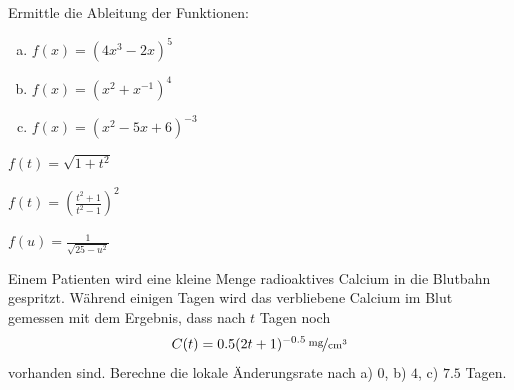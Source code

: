 \documentclass[%
11pt,%
twoside,%
titlepage,%
german,%
headsepline%
]{scrartcl}
\begin{document}
\begin{ueb}\label{uebkettenregel}
Ermittle die Ableitung der Funktionen:

\begin{minipage}{0.45\textwidth}
\begin{enumerate}[a)]
    \item $f(x)=(4x^3-2x)^5$
    \item $f(x)=(x^2+x^{-1})^4$
    \item $f(x)=(x^2-5x+6)^{-3}$
\end{enumerate}
\end{minipage}
\begin{minipage}{0.45\textwidth}
\begin{enumeratea}
\setcounter{enumi}{3}
\item $f(t)=\sqrt{1+t^2}$
\item $f(t)=\left(\frac{t^2+1}{t^2-1}\right)^2$
\item $f(u)=\frac{1}{\sqrt{25-u^2}}$
\end{enumeratea}
\end{minipage}
\end{ueb}



\begin{ueb}[Calcium]\label{uebcalcium}
Einem Patienten wird eine kleine Menge radioaktives Calcium in die Blutbahn gespritzt. W\"ahrend einigen Tagen wird das verbliebene Calcium im Blut gemessen mit dem Ergebnis, dass nach $t$ Tagen noch
$$C(t)=\unitfrac[0.5(2t+1)^{-0.5}]{mg}{cm^3}$$
vorhanden sind. Berechne die lokale \"Anderungsrate nach a) $0$, b) $4$, c) $7.5$ Tagen.
\end{ueb}
\end{document}
